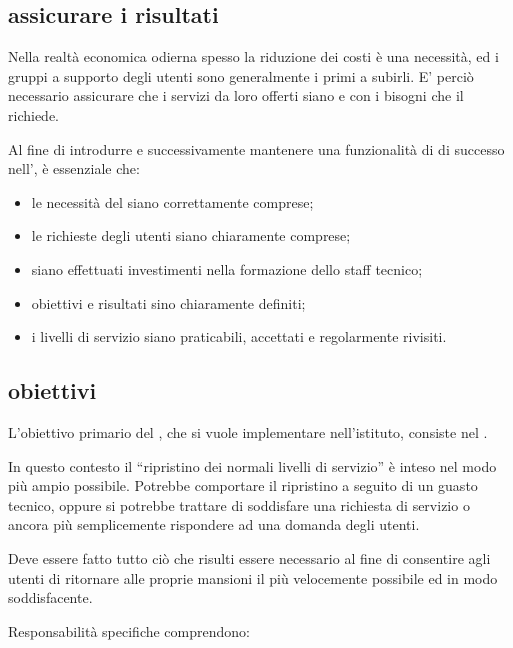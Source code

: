 \subsection[Assicurare i risultati]{assicurare i risultati}
\label{sd-introduction-ensuring-results}
Nella realtà economica odierna spesso la riduzione dei costi è una necessità, ed i gruppi a supporto degli utenti sono generalmente i primi a subirli. E' perciò necessario assicurare che i servizi da loro offerti siano  e  con i bisogni che il  richiede.

Al fine di introdurre e successivamente mantenere una funzionalità di  di successo nell'\entity{}, è essenziale che:

\begin{itemize}
\item{le necessità del  siano correttamente comprese;}
\item{le richieste degli utenti siano chiaramente comprese;}
\item{siano effettuati investimenti nella formazione dello staff tecnico;}
\item{obiettivi e risultati sino chiaramente definiti;}
\item{i livelli di servizio siano praticabili, accettati e regolarmente rivisiti.}
\end{itemize}

\subsection[Obiettivi]{obiettivi}
\label{sd-introduction-objectives}
L'obiettivo primario del , che si vuole implementare nell'istituto, consiste nel . 

In questo contesto il ``ripristino dei normali livelli di servizio'' è inteso nel modo più ampio possibile. Potrebbe comportare il ripristino a seguito di un guasto tecnico, oppure si potrebbe trattare di soddisfare una richiesta di servizio o ancora più semplicemente rispondere ad una domanda degli utenti. 

Deve essere fatto tutto ciò che risulti essere necessario al fine di consentire agli utenti di ritornare alle proprie mansioni il più velocemente possibile ed in modo soddisfacente.

Responsabilità specifiche comprendono:

